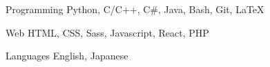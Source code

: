 

\begin{cvskills}

  \cvskill
    {Programming} %
    {Python, C/C++, C\#, Java, Bash, Git, LaTeX} %

  \cvskill
    {Web} %
    {HTML, CSS, Sass, Javascript, React, PHP} %

  \cvskill
    {Languages} %
    {English, Japanese} %

\end{cvskills}
